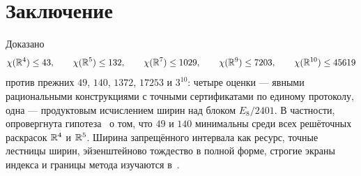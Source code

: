 \section{Заключение}

Доказано
\[
\chi(\mathbb{R}^4)\le43,\qquad \chi(\mathbb{R}^5)\le132,\qquad \chi(\mathbb{R}^7)\le1029,\qquad
\chi(\mathbb{R}^9)\le7203,\qquad \chi(\mathbb{R}^{10})\le45619
\]
против прежних $49$, $140$, $1372$, $17253$ и $3^{10}$: четыре оценки ---
явными рациональными конструкциями с точными сертификатами по единому
протоколу, одна --- продуктовым исчислением ширин над блоком $E_8/2401$. В частности,
опровергнута гипотеза~\cite{ABPR} о том, что $49$ и $140$ минимальны среди всех
решёточных раскрасок $\mathbb{R}^4$ и $\mathbb{R}^5$. Ширина запрещённого интервала как
ресурс, точные лестницы ширин, эйзенштейново тождество в полной форме,
строгие экраны индекса и границы метода изучаются в~\cite{Widths}.
